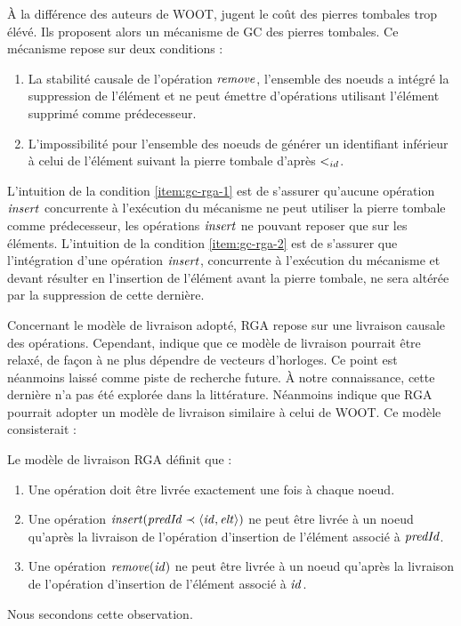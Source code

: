 À la différence des auteurs de WOOT, \textcite{ROH2011354} jugent le coût des pierres tombales trop élévé.
Ils proposent alors un mécanisme de \acf{GC} des pierres tombales.
Ce mécanisme repose sur deux conditions :
\label{sec:gc-rga}
\begin{enumerate}
  \item \label{item:gc-rga-1}
    La stabilité causale de l'opération $\mathit{remove}$, \ie l'ensemble des noeuds a intégré la suppression de l'élément et ne peut émettre d'opérations utilisant l'élément supprimé comme prédecesseur.
  \item \label{item:gc-rga-2}
    L'impossibilité pour l'ensemble des noeuds de générer un identifiant inférieur à celui de l'élément suivant la pierre tombale d'après $<_{id}$.
\end{enumerate}
L'intuition de la condition \ref{item:gc-rga-1} est de s'assurer qu'aucune opération $\mathit{insert}$ concurrente à l'exécution du mécanisme ne peut utiliser la pierre tombale comme prédecesseur, les opérations $\mathit{insert}$ ne pouvant reposer que sur les éléments.
L'intuition de la condition \ref{item:gc-rga-2} est de s'assurer que l'intégration d'une opération $\mathit{insert}$, concurrente à l'exécution du mécanisme et devant résulter en l'insertion de l'élément avant la pierre tombale, ne sera altérée par la suppression de cette dernière.

Concernant le modèle de livraison adopté, \ac{RGA} repose sur une livraison causale des opérations.
Cependant, \cite{ROH2011354} indique que ce modèle de livraison pourrait être relaxé, de façon à ne plus dépendre de vecteurs d'horloges.
Ce point est néanmoins laissé comme piste de recherche future.
À notre connaissance, cette dernière n'a pas été explorée dans la littérature.
Néanmoins \textcite{2021-these-vic} indique que \ac{RGA} pourrait adopter un modèle de livraison similaire à celui de WOOT.
Ce modèle consisterait :
\begin{definition}
  Le modèle de livraison \ac{RGA} définit que :
  \begin{enumerate}
    \item Une opération doit être livrée exactement une fois à chaque noeud.
    \item Une opération $\mathit{insert}(\mathit{predId} \prec \langle \mathit{id},\mathit{elt} \rangle)$ ne peut être livrée à un noeud qu'après la livraison de l'opération d'insertion de l'élément associé à $\mathit{predId}$.
    \item Une opération $\mathit{remove}(\mathit{id})$ ne peut être livrée à un noeud qu'après la livraison de l'opération d'insertion de l'élément associé à $\mathit{id}$.
  \end{enumerate}
\end{definition}
Nous secondons cette observation.

